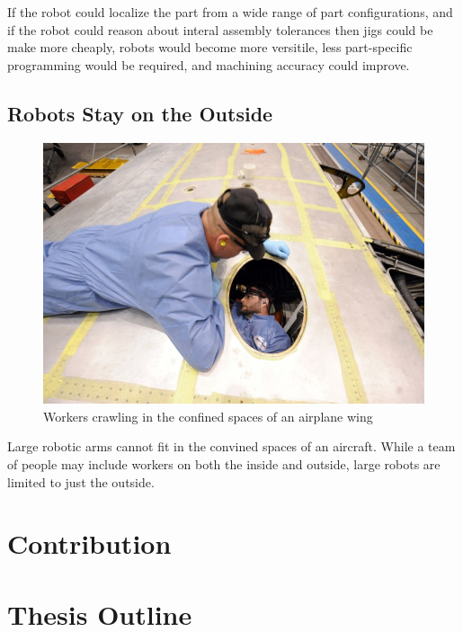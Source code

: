\documentclass[../thesis.tex]{subfiles}
\begin{document}
If the robot could localize the part from a wide range of part configurations, and if the robot could reason about interal assembly tolerances then jigs could be make more cheaply, robots would become more versitile, less part-specific programming would be required, and machining accuracy could improve.

\subsection{Robots Stay on the Outside}

\begin{figure}
  \centering
  \label{fig:PeopleInWing}
  \includegraphics[width=.7\linewidth]{./Introduction/PeopleInWing.jpg}  
  \caption{Workers crawling in the confined spaces of an airplane wing}
\end{figure}

Large robotic arms cannot fit in the convined spaces of an aircraft.
While a team of people may include workers on both the inside and outside, large robots are limited to just the outside.



\section{Contribution}

\section{Thesis Outline}
\end{document}

